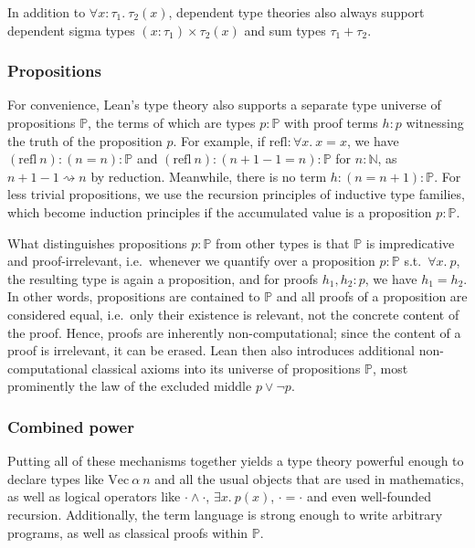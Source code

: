 In addition to $\forall x : \tau_1.\ \tau_2(x)$, dependent type theories also always support dependent sigma types $(x : \tau_1) \times \tau_2(x)$ and sum types $\tau_1 + \tau_2$.

\subsubsection{Propositions}
For convenience, Lean's type theory also supports a separate type universe of propositions $\mathbb{P}$, the terms of which are types $p : \mathbb{P}$ with proof terms $h : p$ witnessing the truth of the proposition $p$. For example, if $\mathrm{refl} : \forall x.\ x = x$, we have $(\mathrm{refl}\ n) : (n = n) : \mathbb{P}$ and $(\mathrm{refl}\ n) : (n + 1 - 1 = n) : \mathbb{P}$ for $n : \mathbb{N}$, as $n + 1 - 1 \rightsquigarrow n$ by reduction. Meanwhile, there is no term $h : (n = n + 1) : \mathbb{P}$. For less trivial propositions, we use the recursion principles of inductive type families, which become induction principles if the accumulated value is a proposition $p : \mathbb{P}$. 

What distinguishes propositions $p : \mathbb{P}$ from other types is that $\mathbb{P}$ is impredicative and proof-irrelevant, i.e.\ whenever we quantify over a proposition $p : \mathbb{P}$ s.t.\ $\forall x.\ p$, the resulting type is again a proposition, and for proofs $h_1, h_2 : p$, we have $h_1 = h_2$. In other words, propositions are contained to $\mathbb{P}$ and all proofs of a proposition are considered equal, i.e.\ only their existence is relevant, not the concrete content of the proof. Hence, proofs are inherently non-computational; since the content of a proof is irrelevant, it can be erased. Lean then also introduces additional non-computational classical axioms into its universe of propositions $\mathbb{P}$, most prominently the law of the excluded middle $p \lor \lnot p$.

\subsubsection{Combined power}
Putting all of these mechanisms together yields a type theory powerful enough to declare types like $\mathrm{Vec}\ \alpha\ n$ and all the usual objects that are used in mathematics, as well as logical operators like $\cdot \land \cdot$, $\exists x.\ p(x)$, $\cdot = \cdot$ and even well-founded recursion. Additionally, the term language is strong enough to write arbitrary programs, as well as classical proofs within $\mathbb{P}$.

